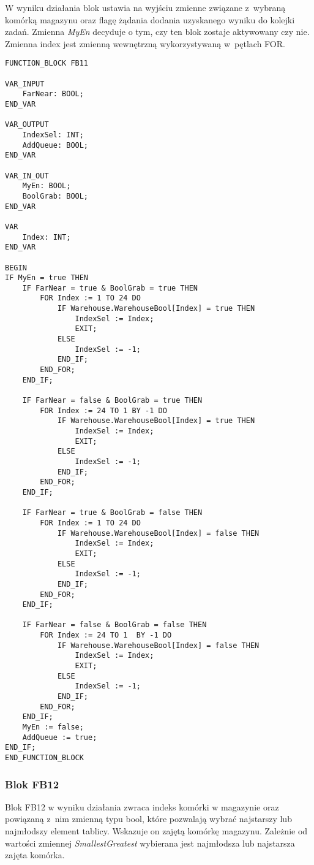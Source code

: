 W wyniku działania blok ustawia na wyjściu zmienne związane z~wybraną komórką magazynu oraz flagę żądania dodania uzyskanego wyniku do kolejki zadań. Zmienna \emph{MyEn} decyduje o tym, czy ten blok zostaje aktywowany czy nie. Zmienna index jest zmienną wewnętrzną wykorzystywaną w~pętlach FOR.
\begin{lstlisting}[caption={FB11 - Funkcja wybiera najdalszą lub najbliższą komórkę}]
FUNCTION_BLOCK FB11

VAR_INPUT
    FarNear: BOOL;
END_VAR 

VAR_OUTPUT
    IndexSel: INT;
    AddQueue: BOOL;
END_VAR
 
VAR_IN_OUT
    MyEn: BOOL;
    BoolGrab: BOOL;
END_VAR  

VAR
    Index: INT;
END_VAR    
    
BEGIN
IF MyEn = true THEN    
    IF FarNear = true & BoolGrab = true THEN    
        FOR Index := 1 TO 24 DO
            IF Warehouse.WarehouseBool[Index] = true THEN
                IndexSel := Index;
                EXIT;
            ELSE
                IndexSel := -1;                
            END_IF;
        END_FOR;        
    END_IF;
    
    IF FarNear = false & BoolGrab = true THEN
        FOR Index := 24 TO 1 BY -1 DO
            IF Warehouse.WarehouseBool[Index] = true THEN
                IndexSel := Index;
                EXIT;
            ELSE
                IndexSel := -1;                                
            END_IF;            
        END_FOR;
    END_IF;
    
    IF FarNear = true & BoolGrab = false THEN
        FOR Index := 1 TO 24 DO
            IF Warehouse.WarehouseBool[Index] = false THEN
                IndexSel := Index;
                EXIT;
            ELSE
                IndexSel := -1;                                                
            END_IF;            
        END_FOR;
    END_IF;
    
    IF FarNear = false & BoolGrab = false THEN
        FOR Index := 24 TO 1  BY -1 DO
            IF Warehouse.WarehouseBool[Index] = false THEN
                IndexSel := Index;
                EXIT;
            ELSE
                IndexSel := -1;                                                
            END_IF;            
        END_FOR;
    END_IF;   
    MyEn := false;
    AddQueue := true;
END_IF;       
END_FUNCTION_BLOCK
\end{lstlisting}
\subsubsection{Blok FB12}
Blok FB12 w wyniku działania zwraca indeks komórki w magazynie oraz powiązaną z~nim zmienną typu bool, które pozwalają wybrać najstarszy lub najmłodszy element tablicy. Wskazuje on zajętą komórkę magazynu. Zależnie od wartości zmiennej \emph{SmallestGreatest} wybierana jest najmłodsza lub najstarsza zajęta komórka. 

